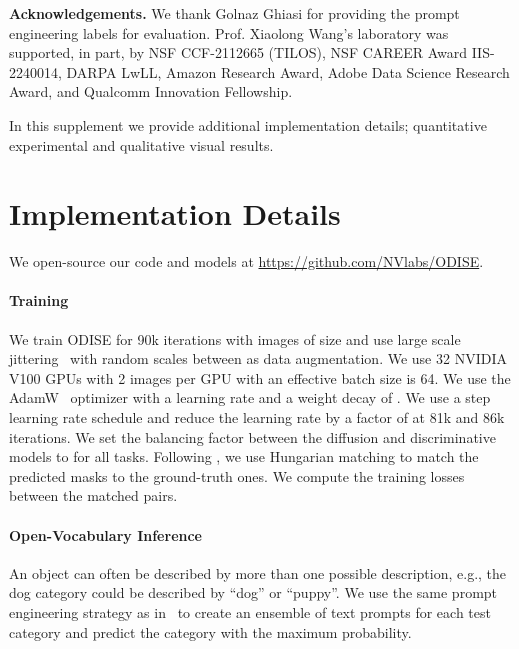 \documentclass[10pt,twocolumn,letterpaper]{article}
\newcommand{\ourmethod}{ODISE}
\begin{document}
{\footnotesize \noindent \textbf{Acknowledgements.} 
We thank Golnaz Ghiasi for providing the prompt engineering labels for evaluation. 
Prof. Xiaolong Wang’s laboratory was supported, in part, by NSF CCF-2112665 (TILOS), NSF CAREER Award IIS-2240014, DARPA LwLL, Amazon Research Award, Adobe Data Science Research Award, and Qualcomm Innovation Fellowship.
}


{\small


}

\renewcommand\thefigure{\thesection.\arabic{figure}}
\renewcommand\thetable{\thesection.\arabic{table}}
\setcounter{figure}{0} 
\setcounter{table}{0} 

\appendix



In this supplement we provide additional implementation details; quantitative experimental and qualitative visual results.

\section{Implementation Details}

We open-source our code and models at \href{https://github.com/NVlabs/ODISE}{https://github.com/NVlabs/ODISE}.

\paragraph{Training}
We train \ourmethod{} for 90k iterations with images of size  and use large scale jittering~\cite{ghiasi2021simple} with random scales between  as data augmentation.
We use 32 NVIDIA V100 GPUs with 2 images per GPU with an effective batch size is 64. 
We use the AdamW~\cite{loshchilov2017decoupled} optimizer with a learning rate  and a weight decay of . 
We use a step learning rate schedule and reduce the learning rate by a factor of  at 81k and 86k iterations.
We set the balancing factor between the diffusion and discriminative models to  for all tasks.
Following \cite{cheng2021maskformer,cheng2022mask2former, carion2020detr}, we use Hungarian matching to match the predicted masks to the ground-truth ones. We compute the training losses between the matched pairs.

\paragraph{Open-Vocabulary Inference}
An object can often be described by more than one possible description, e.g., the dog category could be described by ``dog'' or ``puppy''.
We use the same prompt engineering strategy as in~\cite{ghiasi2021open} to create an ensemble of text prompts for each test category and predict the category with the maximum probability.
\end{document}
